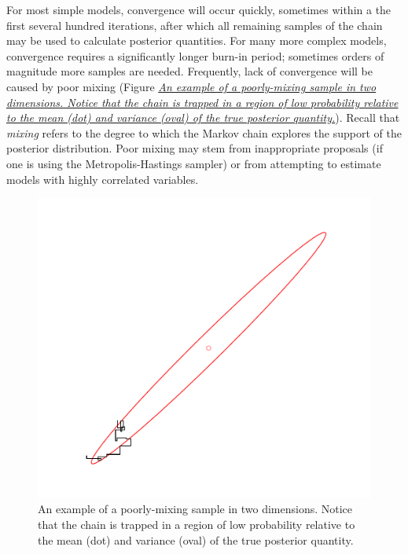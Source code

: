 \documentclass[letterpaper,10pt,english]{sphinxmanual}
\begin{document}
For most simple models, convergence will occur quickly, sometimes within a the first several hundred iterations, after which all remaining samples of the chain may be used to calculate posterior quantities. For many more complex models, convergence requires a significantly longer burn-in period; sometimes orders of magnitude more samples are needed. Frequently, lack of convergence will be caused by poor mixing (Figure {\hyperref[modelchecking:mix]{\emph{An example of a poorly-mixing sample in two dimensions. Notice that the
chain is trapped in a region of low probability relative to the mean
(dot) and variance (oval) of the true posterior quantity.}}}). Recall that \emph{mixing} refers to the degree to which the Markov chain explores the support of the posterior distribution. Poor mixing may stem from inappropriate proposals (if one is using the Metropolis-Hastings sampler) or from attempting to estimate models with highly correlated variables.
\begin{figure}[htbp]
\centering
\capstart

\includegraphics{poormixing.pdf}
\caption{An example of a poorly-mixing sample in two dimensions. Notice that the
chain is trapped in a region of low probability relative to the mean
(dot) and variance (oval) of the true posterior quantity.}\label{modelchecking:mix}\end{figure}
\end{document}
